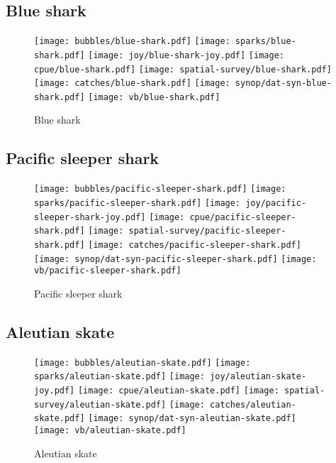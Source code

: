 \subsection*{Blue shark}

\begin{figure}[htbp]
\centering
\texttt{[image: bubbles/blue-shark.pdf]}
\texttt{[image: sparks/blue-shark.pdf]}
\texttt{[image: joy/blue-shark-joy.pdf]}
\texttt{[image: cpue/blue-shark.pdf]}
\texttt{[image: spatial-survey/blue-shark.pdf]}
\texttt{[image: catches/blue-shark.pdf]}
\texttt{[image: synop/dat-syn-blue-shark.pdf]}
\texttt{[image: vb/blue-shark.pdf]}
\caption{Blue shark}
\end{figure}
\clearpage
\subsection*{Pacific sleeper shark}

\begin{figure}[htbp]
\centering
\texttt{[image: bubbles/pacific-sleeper-shark.pdf]}
\texttt{[image: sparks/pacific-sleeper-shark.pdf]}
\texttt{[image: joy/pacific-sleeper-shark-joy.pdf]}
\texttt{[image: cpue/pacific-sleeper-shark.pdf]}
\texttt{[image: spatial-survey/pacific-sleeper-shark.pdf]}
\texttt{[image: catches/pacific-sleeper-shark.pdf]}
\texttt{[image: synop/dat-syn-pacific-sleeper-shark.pdf]}
\texttt{[image: vb/pacific-sleeper-shark.pdf]}
\caption{Pacific sleeper shark}
\end{figure}
\clearpage
\subsection*{Aleutian skate}

\begin{figure}[htbp]
\centering
\texttt{[image: bubbles/aleutian-skate.pdf]}
\texttt{[image: sparks/aleutian-skate.pdf]}
\texttt{[image: joy/aleutian-skate-joy.pdf]}
\texttt{[image: cpue/aleutian-skate.pdf]}
\texttt{[image: spatial-survey/aleutian-skate.pdf]}
\texttt{[image: catches/aleutian-skate.pdf]}
\texttt{[image: synop/dat-syn-aleutian-skate.pdf]}
\texttt{[image: vb/aleutian-skate.pdf]}
\caption{Aleutian skate}
\end{figure}
\clearpage
